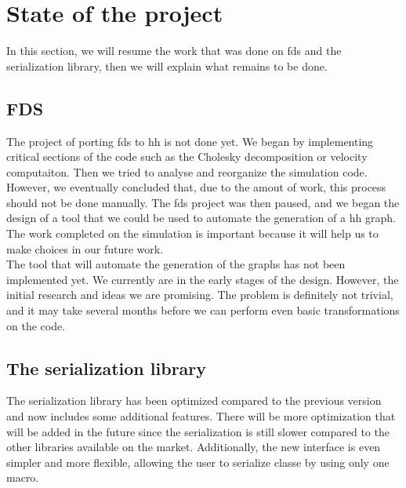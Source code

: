 
\section{State of the project}

In this section, we will resume the work that was done on \gls{fds} and the
serialization library, then we will explain what remains to be done.

\subsection{FDS}

The project of porting \gls{fds} to \gls{hh} is not done yet. We began by
implementing critical sections of the code such as the Cholesky decomposition or
velocity computaiton. Then we tried to analyse and reorganize the simulation
code. However, we eventually concluded that, due to the amout of work, this
process should not be done manually. The \gls{fds} project was then paused, and
we began the design of a tool that we could be used to automate the generation
of a \gls{hh} graph. The work completed on the simulation is important because
it will help us to make choices in our future work.\\

The tool that will automate the generation of the graphs has not been
implemented yet. We currently are in the early stages of the design. However,
the initial research and ideas we are promising. The problem is definitely not
trivial, and it may take several months before we can perform even basic
transformations on the code.

\subsection{The serialization library}

The serialization library has been optimized compared to the previous version
and now includes some additional features. There will be more optimization that
will be added in the future since the serialization is still slower compared to
the other libraries available on the market. Additionally, the new interface is
even simpler and more flexible, allowing the user to serialize classe by using
only one macro.
